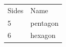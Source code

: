 \begin{table}[H]
{        \begin{center}
      
      \label{m38380*uid92}
      
    \noindent
      \tablelasttail{}
      \begin{xtabular*}{\mytablewidth}[t]{|p{10\mystarwidth}|p{10\mystarwidth}|}\hline
    
    
        Sides &
    
    
        Name%
     \tabularnewline{}
    
    
        5 &
    
    
        pentagon%
     \tabularnewline{}
    
    
        6 &
    
    
        hexagon%
     \tabularnewline{}
    

\end{xtabular*}
\end{center}}
\end{table}
